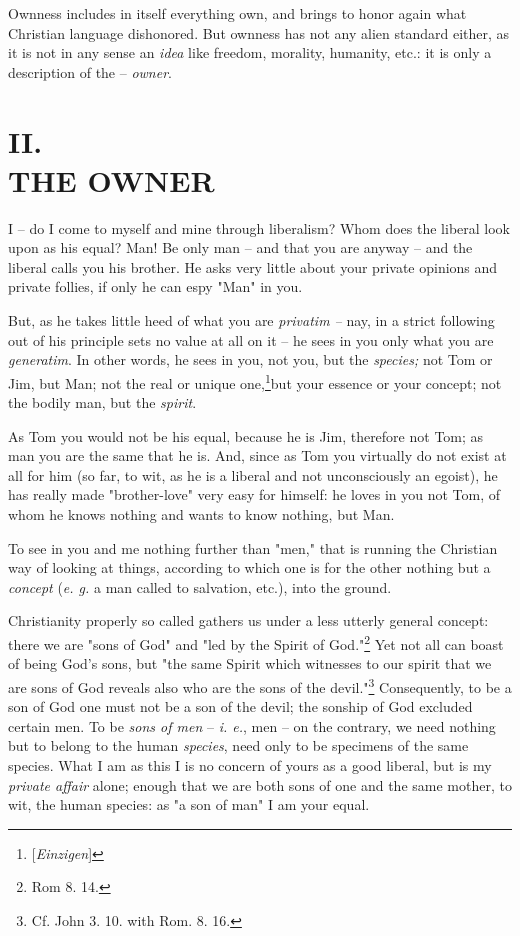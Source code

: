 \documentclass[a4paper]{book}
\begin{document}
Ownness includes in itself everything own, and brings to honor again what 
Christian language dishonored. But ownness has not any alien standard either, 
as it is not in any sense an \textit{idea} like freedom, morality, humanity, 
etc.: it is only a description of the -- \textit{owner}.

\chapter[II. The Owner]{\centering II.\\
THE OWNER}

I -- do I come to myself and mine through liberalism? Whom does the liberal 
look upon as his equal? Man! Be only man -- and that you are anyway -- and the 
liberal calls you his brother. He asks very little about your private opinions 
and private follies, if only he can espy "{}Man"{} in you.

But, as he takes little heed of what you are \textit{privatim --} nay, in a 
strict following out of his principle sets no value at all on it -- he sees in 
you only what you are \textit{generatim}. In other words, he sees in you, not 
you, but the \textit{species;} not Tom or Jim, but Man; not the real or unique 
one,\footnote{[\textit{Einzigen}] }but your essence or your concept; not the 
bodily man, but the \textit{spirit}.

As Tom you would not be his equal, because he is Jim, therefore not Tom; as 
man you are the same that he is. And, since as Tom you virtually do not exist 
at all for him (so far, to wit, as he is a liberal and not unconsciously an 
egoist), he has really made "{}brother-love"{} very easy for himself: he loves 
in you not Tom, of whom he knows nothing and wants to know nothing, but Man.

To see in you and me nothing further than "{}men,"{} that is running the 
Christian way of looking at things, according to which one is for the other 
nothing but a \textit{concept} (\textit{e. g.} a man called to salvation, 
etc.), into the ground.

Christianity properly so called gathers us under a less utterly general 
concept: there we are "{}sons of God"{} and "{}led by the Spirit of 
God."{}\footnote{Rom 8. 14.} Yet not all can boast of being God's sons, but 
"{}the same Spirit which witnesses to our spirit that we are sons of God 
reveals also who are the sons of the devil."{}\footnote{Cf. John 3. 10. with 
Rom. 8. 16.} Consequently, to be a son of God one must not be a son of the 
devil; the sonship of God excluded certain men. To be \textit{sons of men} -- 
\textit{i. e.}, men -- on the contrary, we need nothing but to belong to the 
human \textit{species}, need only to be specimens of the same species. What I 
am as this I is no concern of yours as a good liberal, but is my 
\textit{private affair} alone; enough that we are both sons of one and the 
same mother, to wit, the human species: as "{}a son of man"{} I am your equal.
\end{document}
